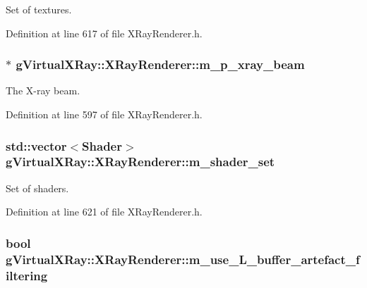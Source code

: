 Set of textures. 



Definition at line 617 of file XRayRenderer.h.

\hypertarget{classg_virtual_x_ray_1_1_x_ray_renderer_a10326c78ad5b1ff35d529efa4212aa78}{
\subsubsection[{m\_\-p\_\-xray\_\-beam}]{$\ast$ {\bf gVirtualXRay::XRayRenderer::m\_\-p\_\-xray\_\-beam}}}
\label{classg_virtual_x_ray_1_1_x_ray_renderer_a10326c78ad5b1ff35d529efa4212aa78}


The X-\/ray beam. 



Definition at line 597 of file XRayRenderer.h.

\hypertarget{classg_virtual_x_ray_1_1_x_ray_renderer_a737acc3cdfe28c3db90dfd69dce0a203}{
\subsubsection[{m\_\-shader\_\-set}]{\setlength{\rightskip}{0pt plus 5cm}std::vector$<${\bf Shader}$>$ {\bf gVirtualXRay::XRayRenderer::m\_\-shader\_\-set}}}
\label{classg_virtual_x_ray_1_1_x_ray_renderer_a737acc3cdfe28c3db90dfd69dce0a203}


Set of shaders. 



Definition at line 621 of file XRayRenderer.h.

\hypertarget{classg_virtual_x_ray_1_1_x_ray_renderer_ade779286f936cbe987f62796e2222916}{
\subsubsection[{m\_\-use\_\-L\_\-buffer\_\-artefact\_\-filtering}]{\setlength{\rightskip}{0pt plus 5cm}bool {\bf gVirtualXRay::XRayRenderer::m\_\-use\_\-L\_\-buffer\_\-artefact\_\-filtering}}}
\label{classg_virtual_x_ray_1_1_x_ray_renderer_ade779286f936cbe987f62796e2222916}


